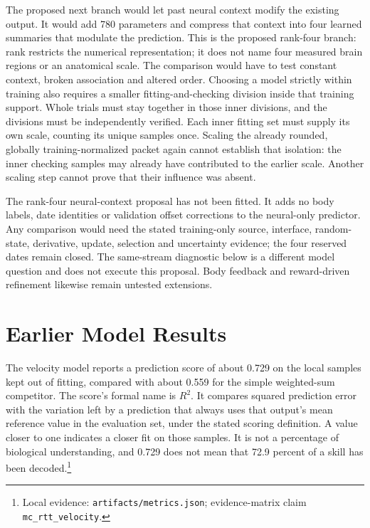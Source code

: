 The proposed next branch would let past neural context modify the existing
output. It would add 780 parameters and compress that context into four learned
summaries that modulate the prediction. This is the proposed rank-four branch:
rank restricts the numerical representation; it does not name four measured
brain regions or an anatomical scale. The comparison would have to test constant
context, broken association and altered order. Choosing a model strictly within
training also requires a smaller fitting-and-checking division inside that
training support. Whole trials must stay together in those inner divisions,
and the divisions must be independently verified. Each inner fitting set must
supply its own scale, counting its unique samples once. Scaling the already
rounded, globally training-normalized packet again cannot establish that
isolation: the inner checking samples may already have contributed to the
earlier scale. Another scaling step cannot prove that their influence was absent.

The rank-four neural-context proposal has not been fitted. It adds no body labels, date identities or validation offset corrections to the neural-only predictor. Any comparison would need the stated training-only source, interface, random-state, derivative, update, selection and uncertainty evidence; the four reserved dates remain closed. The same-stream diagnostic below is a different model question and does not execute this proposal. Body feedback and reward-driven refinement likewise remain untested extensions.




\section{Earlier Model Results}

The velocity model reports a prediction score of about 0.729 on the local samples kept out of fitting, compared with about 0.559 for the simple weighted-sum competitor. The score's formal name is $R^2$. It compares squared prediction error with the variation left by a prediction that always uses that output's mean reference value in the evaluation set, under the stated scoring definition. A value closer to one indicates a closer fit on those samples. It is not a percentage of biological understanding, and 0.729 does not mean that 72.9 percent of a skill has been decoded.\footnote{Local evidence: \texttt{artifacts/metrics.json}; evidence-matrix claim \texttt{mc\_rtt\_velocity}.}

